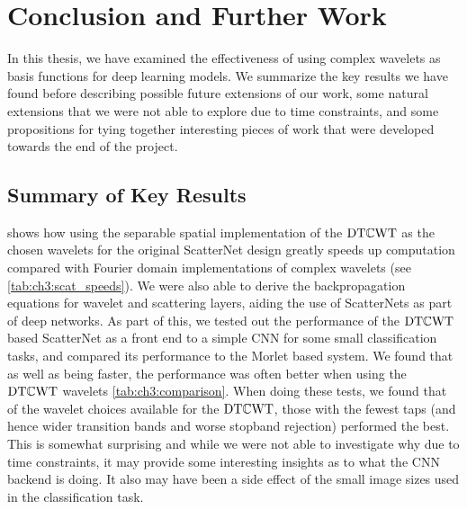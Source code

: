 \chapter{Conclusion and Further Work}\label{ch:conclusion}
\def \path {other/}
\def \imgpath {\path/images}

In this thesis, we have examined the effectiveness of using complex wavelets as
basis functions for deep learning models. We summarize the key results we have
found before describing possible future extensions of our work, some natural
extensions that we were not able to explore due to time constraints, and some
propositions for tying together interesting pieces of work that were developed
towards the end of the project.


\section{Summary of Key Results}
\textbf{} shows how using the separable spatial implementation of
the $\mathrm{DT}\mathbb{C}\mathrm{WT}$ as the chosen wavelets for the original ScatterNet design greatly
speeds up computation compared with Fourier domain implementations of complex
wavelets (see \autoref{tab:ch3:scat_speeds}). We were also able to
derive the backpropagation equations for wavelet and scattering layers, aiding
the use of ScatterNets as part of deep networks. As part of this, we tested out
the performance of the $\mathrm{DT}\mathbb{C}\mathrm{WT}$ based ScatterNet as a front end to a simple CNN for
some small classification tasks, and compared its performance to the Morlet based system. We
found that as well as being faster, the performance was often better when using
the $\mathrm{DT}\mathbb{C}\mathrm{WT}$ wavelets \autoref{tab:ch3:comparison}. When doing these tests, we
found that of the wavelet choices available for the $\mathrm{DT}\mathbb{C}\mathrm{WT}$, those with the
fewest taps (and hence wider transition bands and worse stopband rejection)
performed the best. This is somewhat surprising and while we were not able to
investigate why due to time constraints, it may provide some interesting
insights as to what the CNN backend is doing. It also may have been a side
effect of the small image sizes used in the classification task.

